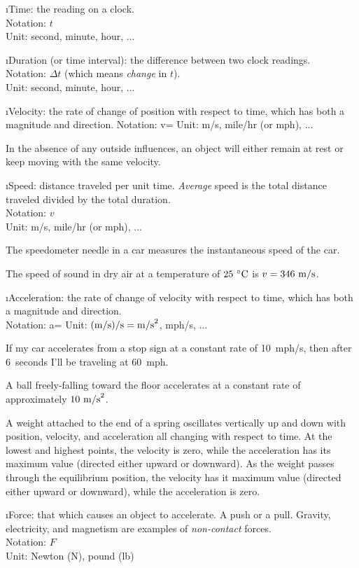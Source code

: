 \i Time: the reading on a clock.
\\
Notation: $t$
\\
Unit: second, minute, hour, ...

\i Duration (or time interval): 
the difference between two clock readings.
\\
Notation: $\Delta t$ (which means {\em change} in $t$).
\\
Unit: second, minute, hour, ...

\i Velocity: 
the rate of change of position with respect to 
time, which has both a magnitude and direction.
Notation:
%
\be
v= 
\ee
%
Unit: m/s, mile/hr (or mph), ...

In the absence of any outside influences, an object will either 
remain at rest or keep moving with the same velocity.

\i Speed: 
distance traveled per unit time. 
{\em Average} speed is the total distance traveled divided by
the total duration.
\\
Notation: $v$ 
\\
Unit: m/s, mile/hr (or mph), ...

\ex The speedometer needle in a car measures the instantaneous 
speed of the car.

\ex The speed of sound in dry air at a temperature of 
$25~{}^\circ{\rm C}$ is $v=346~{\rm m/s}$.

\i Acceleration: 
the rate of change of velocity with respect to 
time, which has both a magnitude and direction.
\\
Notation:
%
\be
a= 
\ee
%
Unit: ${\rm (m/s)/s} = {\rm m/s}^2$, mph/s, ...

\ex If my car accelerates from a stop sign at a 
constant rate of 10~mph/s, then after 6~seconds
I'll be traveling at 60~mph.

\ex A ball freely-falling toward the floor accelerates
at a constant rate of approximately $10~{\rm m/s}^2$.

\ex A weight attached to the end of a spring
oscillates vertically up and down with position, velocity,
and acceleration all changing with respect to time.
At the lowest and highest points, the velocity is zero,
while the acceleration has its maximum value (directed 
either upward or downward).
As the weight passes through the equilibrium position, 
the velocity has it maximum value (directed either upward
or downward), while the acceleration is zero.

\i Force: 
that which causes an object to accelerate.
A push or a pull. 
Gravity, electricity, and magnetism are examples of 
{\em non-contact} forces.
\\
Notation: $F$
\\
Unit: Newton (N), pound (lb)

